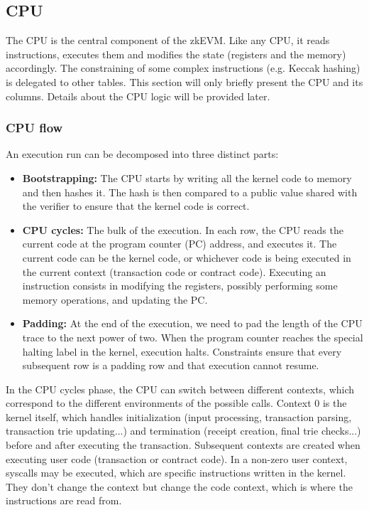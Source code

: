 \subsection{CPU}
\label{cpu}

The CPU is the central component of the zkEVM. Like any CPU, it reads instructions, executes them and modifies the state (registers and the memory)
accordingly. The constraining of some complex instructions (e.g. Keccak hashing) is delegated to other tables.
This section will only briefly present the CPU and its columns. Details about the CPU logic will be provided later.

\subsubsection{CPU flow}

An execution run can be decomposed into three distinct parts:
\begin{itemize}
    \item \textbf{Bootstrapping:} The CPU starts by writing all the kernel code to memory and then hashes it. The hash is then compared to a public value shared with
the verifier to ensure that the kernel code is correct.
    \item \textbf{CPU cycles:} The bulk of the execution. In each row, the CPU reads the current code at the program counter (PC) address, and executes it. The current code can be the kernel code,
or whichever code is being executed in the current context (transaction code or contract code). Executing an instruction consists in modifying the registers, possibly
performing some memory operations, and updating the PC.
\item \textbf{Padding:} At the end of the execution, we need to pad the length of the CPU trace to the next power of two. When the program counter reaches the special halting label
in the kernel, execution halts. Constraints ensure that every subsequent row is a padding row and that execution cannot resume.
\end{itemize}

In the CPU cycles phase, the CPU can switch between different contexts, which correspond to the different environments of the possible calls. Context 0 is the kernel itself, which
handles initialization (input processing, transaction parsing, transaction trie updating...) and termination (receipt creation, final trie checks...) before and after executing the transaction. Subsequent contexts are created when
executing user code (transaction or contract code). In a non-zero user context, syscalls may be executed, which are specific instructions written in the kernel. They don't change the context
but change the code context, which is where the instructions are read from.

